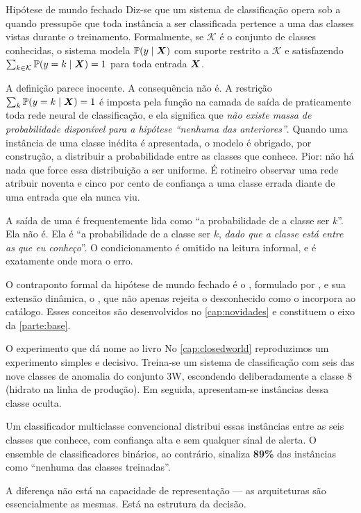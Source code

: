 \begin{definicao}{Hipótese de mundo fechado}
Diz-se que um sistema de classificação opera sob a  quando pressupõe que toda instância a ser
classificada pertence a uma das classes vistas durante o treinamento. Formalmente, se
$\mathcal{K}$ é o conjunto de classes conhecidas, o sistema modela
$\mathbb{P}(y \mid \bm{X})$ com suporte restrito a $\mathcal{K}$ e satisfazendo
$\sum_{k \in \mathcal{K}} \mathbb{P}(y = k \mid \bm{X}) = 1$ para toda entrada $\bm{X}$.
\end{definicao}

A definição parece inocente. A consequência não é. A restrição
$\sum_k \mathbb{P}(y=k \mid \bm{X}) = 1$ é imposta pela função  na camada de
saída de praticamente toda rede neural de classificação, e ela significa que \emph{não
existe massa de probabilidade disponível para a hipótese ``nenhuma das anteriores''}.
Quando uma instância de uma classe inédita é apresentada, o modelo é obrigado, por
construção, a distribuir a probabilidade entre as classes que conhece. Pior: não há
nada que force essa distribuição a ser uniforme. É rotineiro observar uma rede
atribuir noventa e cinco por cento de confiança a uma classe errada diante de uma
entrada que ela nunca viu.

\begin{destaque}
A saída de uma  é frequentemente lida como ``a probabilidade de a classe
ser $k$''. Ela não é. Ela é ``a probabilidade de a classe ser $k$, \emph{dado que a
classe está entre as que eu conheço}''. O condicionamento é omitido na leitura
informal, e é exatamente onde mora o erro.
\end{destaque}

O contraponto formal da hipótese de mundo fechado é o , formulado por \citet{Scheirer2013}, e sua extensão
dinâmica, o , que não apenas
rejeita o desconhecido como o incorpora ao catálogo. Esses conceitos são desenvolvidos
no \cref{cap:novidades} e constituem o eixo da \cref{parte:base}.

\begin{exemplo}{O experimento que dá nome ao livro}
No \cref{cap:closedworld} reproduzimos um experimento simples e decisivo. Treina-se um
sistema de classificação com seis das nove classes de anomalia do conjunto 3W,
escondendo deliberadamente a classe 8 (hidrato na linha de produção). Em seguida,
apresentam-se instâncias dessa classe oculta.

Um classificador multiclasse convencional distribui essas instâncias entre as seis
classes que conhece, com confiança alta e sem qualquer sinal de alerta. O ensemble de
classificadores binários, ao contrário, sinaliza \textbf{89\%} das instâncias como
``nenhuma das classes treinadas''.

A diferença não está na capacidade de representação --- as arquiteturas são
essencialmente as mesmas. Está na estrutura da decisão.
\end{exemplo}

